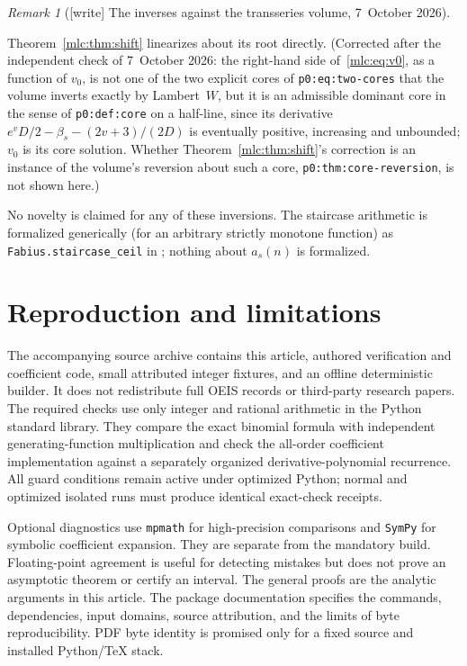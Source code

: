 \documentclass[11pt]{article}
\theoremstyle{remark}\newtheorem{remark}[theorem]{Remark}
\newcommand{\file}[1]{\nolinkurl{#1}}
\begin{document}
\begin{remark}[{[write]} The inverses against the transseries volume, 7~October 2026]
\begin{enumerate}[label=(\alph*)]
 Theorem~\ref{mlc:thm:shift} linearizes about its root directly.
 \textup{(Corrected after the independent check of 7~October 2026: the
 right-hand side of~\eqref{mlc:eq:v0}, as a function of $v_0$, is not one of
 the two explicit cores of \file{p0:eq:two-cores} that the volume inverts
 exactly by Lambert~$W$, but it is an admissible dominant core in the sense of
 \file{p0:def:core} on a half-line, since its derivative
 $e^{v}D/2-\beta_s-(2v+3)/(2D)$ is eventually positive, increasing and
 unbounded; $v_0$ is its core solution. Whether
 Theorem~\ref{mlc:thm:shift}'s correction is an instance of the volume's
 reversion about such a core, \file{p0:thm:core-reversion}, is not shown
 here.)}
\end{enumerate}
No novelty is claimed for any of these inversions. The staircase arithmetic
is formalized generically (for an arbitrary strictly monotone function) as
\file{Fabius.staircase_ceil} in
;
nothing about $a_s(n)$ is formalized.
\end{remark}

\section{Reproduction and limitations}\label{mlc:sec:reproduction}
The accompanying source archive contains this article, authored verification and coefficient code, small attributed integer fixtures, and an offline deterministic builder. It does not redistribute full OEIS records or third-party research papers. The required checks use only integer and rational arithmetic in the Python standard library. They compare the exact binomial formula with independent generating-function multiplication and check the all-order coefficient implementation against a separately organized derivative-polynomial recurrence. All guard conditions remain active under optimized Python; normal and optimized isolated runs must produce identical exact-check receipts.

Optional diagnostics use \texttt{mpmath} for high-precision comparisons and \texttt{SymPy} for symbolic coefficient expansion. They are separate from the mandatory build. Floating-point agreement is useful for detecting mistakes but does not prove an asymptotic theorem or certify an interval. The general proofs are the analytic arguments in this article. The package documentation specifies the commands, dependencies, input domains, source attribution, and the limits of byte reproducibility. PDF byte identity is promised only for a fixed source and installed Python/TeX stack.
\end{document}
